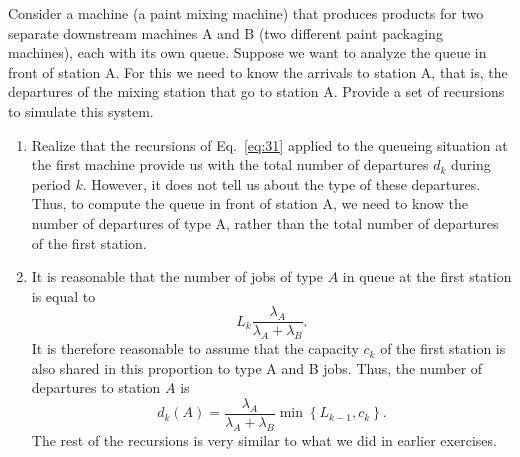 \begin{exercise}
  Consider a machine (a paint mixing machine) that produces products
  for two separate downstream machines A and B (two different paint
  packaging machines), each with its own queue.  Suppose we want to
  analyze the queue in front of station A. For this we need to know
  the arrivals to station A, that is, the departures of the mixing
  station that go to station A. Provide a set of recursions to
  simulate this system.
  \begin{solution}
\begin{enumerate}
\item Realize that the recursions of Eq.~\eqref{eq:31} applied to the
  queueing situation at the first machine provide us with the total
  number of departures $d_k$ during period $k$. However, it does not
  tell us about the type of these departures. Thus, to compute the
  queue in front of station A, we need to know the number of
  departures of type A, rather than the total number of departures of
  the first station.
\item It is reasonable that the number of jobs of type $A$ in queue at
  the first station is equal to
  \begin{equation*}
  L_k \frac{\lambda_A}{\lambda_A + \lambda_B}.
  \end{equation*}
  It is therefore reasonable to assume that the capacity $c_k$ of the
  first station is also shared in this proportion to type A and B
  jobs. Thus, the number of departures to station $A$ is
  \begin{equation*}
    d_k(A) = \frac{\lambda_A}{\lambda_A+\lambda_B} \min\left\{ L_{k-1}, c_k\right\}.
  \end{equation*}
 The rest of the recursions is very similar to what we did in earlier exercises.
\end{enumerate}
  \end{solution}
\end{exercise}



